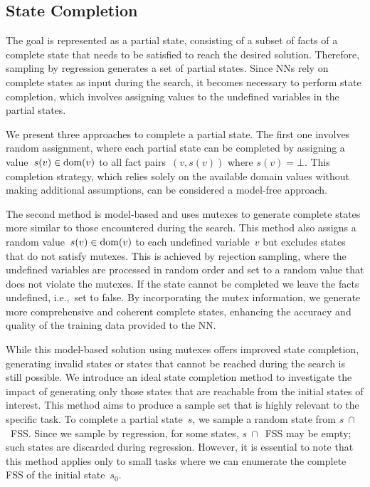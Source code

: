\subsection{State Completion}
\label{sec:state-completion}

The goal is represented as a partial state, consisting of a subset of facts of a complete state that needs to be satisfied to reach the desired solution. Therefore, sampling by regression generates a set of partial states. Since NNs rely on complete states as input during the search, it becomes necessary to perform state completion, which involves assigning values to the undefined variables in the partial states.

We present three approaches to complete a partial state. The first one involves random assignment, where each partial state can be completed by assigning a value~$s(v) \in \operatorname{dom}(v)$ to all fact pairs~$(v,s(v))$ where $s(v)=\bot$. This completion strategy, which relies solely on the available domain values without making additional assumptions, can be considered a model-free approach.

The second method is model-based and uses mutexes to generate complete states more similar to those encountered during the search. This method also assigns a random value~$s(v) \in \operatorname{dom}(v)$ to each undefined variable~$v$ but excludes states that do not satisfy mutexes. This is achieved by rejection sampling, where the undefined variables are processed in random order and set to a random value that does not violate the mutexes. If the state cannot be completed we leave the facts undefined, i.e.,~set to false. By incorporating the mutex information, we generate more comprehensive and coherent complete states, enhancing the accuracy and quality of the training data provided to the NN.

While this model-based solution using mutexes offers improved state completion, generating invalid states or states that cannot be reached during the search is still possible. We introduce an ideal state completion method to investigate the impact of generating only those states that are reachable from the initial states of interest. This method aims to produce a sample set that is highly relevant to the specific task. To complete a partial state~$s$, we sample a random state from $s~\cap$~FSS. Since we sample by regression, for some states, $s~\cap$~FSS may be empty; such states are discarded during regression. However, it is essential to note that this method applies only to small tasks where we can enumerate the complete FSS of the initial state~$s_0$.

